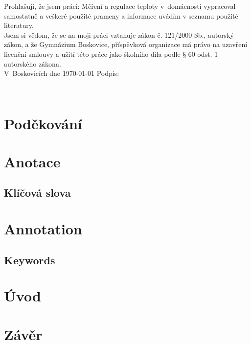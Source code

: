 \documentclass[12pt,a4paper]{article}
\begin{document}
Prohlašuji, že jsem práci: Měření a regulace teploty v~domácnosti vypracoval samostatně a veškeré použité prameny a informace uvádím v seznamu použité literatury. \\[4mm]
Jsem si vědom, že se na moji práci vztahuje zákon č. 121/2000 Sb., autorský zákon, a že Gymnázium Boskovice, příspěvková organizace má právo na uzavření licenční smlouvy a užití této práce jako školního díla podle § 60 odst. 1 autorského zákona. \\[8mm]
V~Boskovicích dne \today \hspace{24mm} Podpis:

\newpage

~ \vspace{160mm}

\section*{Poděkování}


\newpage

\section*{Anotace}


\subsection*{Klíčová slova}


\section*{Annotation}


\subsection*{Keywords}


\newpage

\tableofcontents

\newpage

\pagestyle{plain}

\section*{Úvod}


\newpage

\section*{Závěr}
\end{document}
